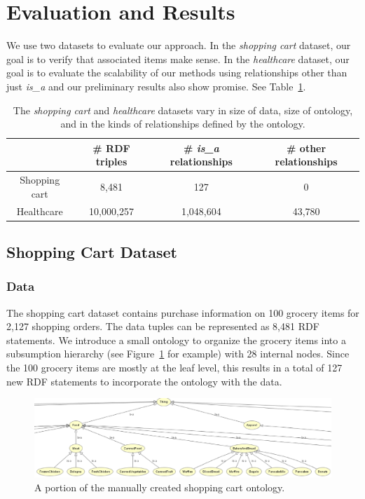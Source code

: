 \section{Evaluation and Results}
\label{experiment}
We use two datasets to evaluate our approach.  In the \emph{shopping cart} dataset, our goal is to verify that associated items make sense.  In the \emph{healthcare} dataset, our goal is to evaluate the scalability of our methods using relationships other than just \emph{is\_a} and our preliminary results also show promise. See Table~\ref{tbl:exp_overview}.

\begin{table}[tbh]\scriptsize
\begin{center}
\begin{tabular}{c|c|c|c}
\hline
    & \# RDF triples & \# \emph{is\_a} relationships & \# other relationships \\
    \hline
  Shopping cart     &  8,481       & 127       &    0\\
  Healthcare &  10,000,257  & 1,048,604 &    43,780\\
  \hline
\end{tabular}
\end{center}
\caption{\label{tbl:exp_overview} The \emph{shopping cart} and \emph{healthcare} datasets vary in size of data, size of ontology, and in the kinds of relationships defined by the ontology.}
\end{table}


\subsection{Shopping Cart Dataset}
\subsubsection{Data}
The shopping cart dataset contains purchase information on 100 grocery items for 2,127 shopping orders. The data tuples can be represented as 8,481 RDF statements.  We introduce a small ontology to organize the grocery items into a subsumption hierarchy (see Figure~\ref{fig:foodmart_onto} for example) with 28 internal nodes.  Since the 100 grocery items are mostly at the leaf level, this results in a total of 127 new RDF statements to incorporate the ontology with the data.

\begin{figure}[tbh]
\begin{center}
\includegraphics[width=\textwidth]{fig/foodmart_onto2.eps}
\end{center}
\caption{\label{fig:foodmart_onto} A portion of the manually created shopping cart ontology.}
\end{figure}

